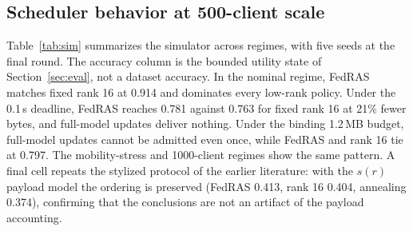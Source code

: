 \documentclass[preprint,12pt]{elsarticle}
\begin{document}
\subsection{Scheduler behavior at 500-client scale}
\label{sec:simsim}
Table~\ref{tab:sim} summarizes the simulator across regimes, with five seeds at the final round. The accuracy column is the bounded utility state of Section~\ref{sec:eval}, not a dataset accuracy. In the nominal regime, FedRAS matches fixed rank 16 at 0.914 and dominates every low-rank policy. Under the 0.1\,s deadline, FedRAS reaches 0.781 against 0.763 for fixed rank 16 at 21\% fewer bytes, and full-model updates deliver nothing. Under the binding 1.2\,MB budget, full-model updates cannot be admitted even once, while FedRAS and rank 16 tie at 0.797. The mobility-stress and 1000-client regimes show the same pattern. A final cell repeats the stylized protocol of the earlier literature: with the $s(r)$ payload model the ordering is preserved (FedRAS 0.413, rank 16 0.404, annealing 0.374), confirming that the conclusions are not an artifact of the payload accounting.

\begin{table}[t]
\centering
\caption{Scheduler simulation with 500 clients, 150 rounds, and five seeds. The accuracy column is a bounded scheduling proxy, not dataset accuracy. Timely delivery ratio is the mean delivery probability for admitted clients, and MB is the attempted uplink payload total for admitted clients in the final round. FedAvg refers to full-model updates at their real 5.29\,MB size.}
\label{tab:sim}
\end{table}
\end{document}
